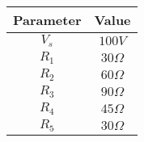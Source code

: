 \begin{tabular}{|c|c|}
\hline
    \textbf{Parameter} & \textbf{Value} \\
    \hline
    $V_s$ & $100V$\\
    \hline
    $R_1$ & $30\Omega$\\
    \hline
    $R_2$ & $60\Omega$\\
    \hline
    $R_3$ & $90\Omega$\\
    \hline
    $R_4$ & $45\Omega$\\
    \hline
    $R_5$ & $30\Omega$\\
    \hline
    \end{tabular}
